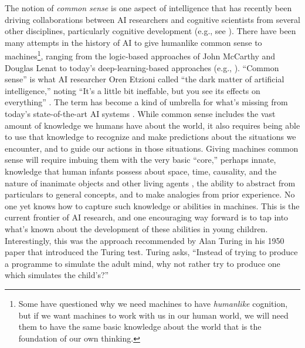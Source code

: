 \documentclass[12pt]{article}
\begin{document}
The notion of \textit{common sense} is one aspect of intelligence that has recently been driving collaborations between AI researchers and cognitive scientists from several other disciplines, particularly cognitive development (e.g., see \cite{DARPA}).  There have been many attempts in the history of AI to give humanlike common sense to machines\footnote{Some have questioned why we need machines to have   \textit{humanlike} cognition, but if we want machines to work with   us in our human world, we will need them to have the same basic   knowledge about the world that is the foundation of our own   thinking.}, ranging from the logic-based approaches of John McCarthy \cite{McCarthy1986} and Douglas Lenat \cite{Lenat1990} to today's deep-learning-based approaches (e.g., \cite{Zellers2019}).  ``Common sense'' is what AI researcher Oren Etzioni called ``the dark matter of artificial intelligence,'' noting ``It's a little bit ineffable, but you see its effects on everything'' \cite{Knight2018}. The term has become a kind of umbrella for what's missing from today's state-of-the-art AI systems \cite{Davis2015,Levesque2017}.  While common sense includes the vast amount of knowledge we humans have about the world, it also requires being able to use that knowledge to recognize and make predictions about the situations we encounter, and to guide our actions in those situations.  Giving machines common sense will require imbuing them with the very basic ``core,'' perhaps innate, knowledge that human infants possess about space, time, causality, and the nature of inanimate objects and other living agents \cite{Spelke2007}, the ability to abstract from particulars to general concepts, and to make analogies from prior experience.  No one yet knows how to capture such knowledge or abilities in machines. This is the current frontier of AI research, and one encouraging way forward is to tap into what's known about the development of these abilities in young children.  Interestingly, this was the approach recommended by Alan Turing in his 1950 paper that introduced the Turing test.  Turing asks, ``Instead of trying to produce a programme to simulate the adult mind, why not rather try to produce one which simulates the child's?'' \cite{Turing1950}
\end{document}
